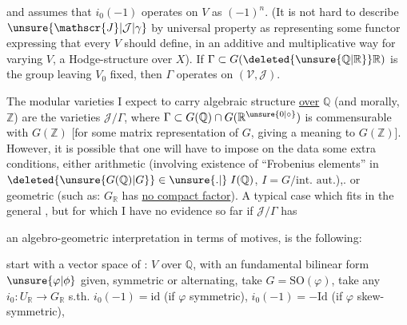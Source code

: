 and assumes that $i_0(-1)$ operates on $V$ as  $(-1)^n$. (It is not hard to describe $\unsure{\mathscr{J}|\mathcal{J}|\gamma}$ by universal property as  representing some functor  expressing that every $V$  should define, in an additive and multiplicative way for varying $V$, a Hodge-structure  over $X$). If $\Gamma\subset G(\deleted{\unsure{\mathbb{Q}|\mathbb{R}}}\mathbb{R})$ is the group leaving $V_0$ fixed, then $\Gamma$ operates on $(\mathscr{V},\mathscr{J})$.

The modular varieties I expect to carry algebraic structure \uline{over} $\mathbb{Q}$ (and morally, $\mathbb{Z}$) are the varieties $\boxed{\mathscr{J}/\Gamma}$, where $\Gamma\subset G(\mathbb{Q})\cap G(\mathbb{R}^{\unsure{0|\circ}})$  is commensurable with $G(\mathbb{Z})$ [for some matrix representation of $G$,  giving a meaning to $G(\mathbb{Z})$]. However, it is possible that one will have to impose on the data some extra conditions, either arithmetic (involving existence of ``Frobenius elements'' in $\deleted{\unsure{G(\mathbb{Q})|G}}\in\unsure{.|{}}\;I(\mathbb{Q})$, $I=G/\text{int. aut.}$),. or geometric  (such as: $G_{\mathbb{R}}$ has \uline{no compact factor}). A typical case which fits in the general  , but for which I have no evidence so far if $\mathscr{J}/\Gamma$ has


an algebro-geometric interpretation in terms of  motives, is the following:

start with a vector space of  : $V$ over $\mathbb{Q}$, with an fundamental bilinear form $\unsure{\varphi|\phi}$ given, symmetric or alternating, take $G=\mathrm{SO}(\varphi)$, take any $i_0:U_{\mathbb{R}}\to G_{\mathbb{R}}$ s.th. $i_0(-1)=\mathrm{id}$ (if $\varphi$ symmetric), $i_0(-1)=-\mathrm{Id}$ (if $\varphi$  skew-symmetric),   


